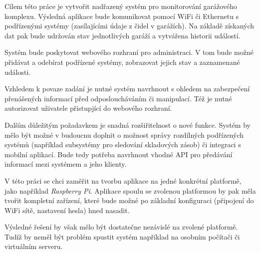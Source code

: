 Cílem této práce je vytvořit nadřazený systém pro monitorování garážového komplexu. Výsledná aplikace bude komunikovat pomocí WiFi či Ethernetu s podřízenými systémy (zasílajícími údaje z čidel v garážích). Na základě získaných dat pak bude udržován stav jednotlivých garáží a vytvářena historii událostí.

Systém bude poskytovat webového rozhraní pro administraci. V tom bude možné přidávat a odebírat podřízené systémy, zobrazovat jejich stav a zaznamenané události.

Vzhledem k povaze zadání je nutné systém navrhnout s ohledem na zabezpečení přenášených informací před odposloucháváním či manipulací. Též je nutné autorizovat uživatele přistupjící do webového rozhraní.

Dalším důležitým požadavkem je snadná rozšiřitelnost o nové funkce. Systém by mělo být možné v budoucnu doplnit o možnost správy rozdílných podřízených systémů (například subsystémy pro sledování skladových zásob) či integraci s mobilní aplikací. Bude tedy potřeba navrhnout vhodné API pro předávání informací mezi systémem a jeho klienty. 

V této práci se chci zaměřit na tvorbu aplikace na jedné konkrétní platformě, jako například \textit{Raspberry Pi}. Aplikace spoulu se zvolenou platformou by pak měla tvořit kompletní zařízení, které bude možné po základní konfiguraci (připojení do WiFi sítě, nastavení hesla) hned nasadit.

Výsledné řešení by však mělo být dostatečne nezávislé na zvolené platformě. Tudíž by neměl být problém spustit systém například na osobním počítači či virtuálním serveru.


